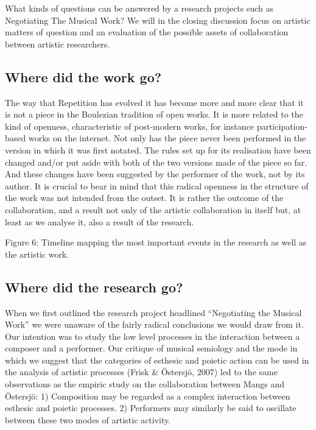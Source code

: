 What kinds of questions can be answered by a research projects such as
Negotiating The Musical Work? We will in the closing discussion focus
on artistic matters of question and an evaluation of the possible
assets of collaboration between artistic researchers.

\subsection{Where did the work go?}
\label{sec:where-did-work-1}

The way that Repetition has evolved it has become more and more clear
that it is not a piece in the Boulezian tradition of open works. It is
more related to the kind of openness, characteristic of post-modern
works, for instance participation-based works on the internet. Not
only has the piece never been performed in the version in which it was
first notated. The rules set up for its realisation have been changed
and/or put aside with both of the two versions made of the piece so
far. And these changes have been suggested by the performer of the
work, not by its author. It is crucial to bear in mind that this
radical openness in the structure of the work was not intended from
the outset. It is rather the outcome of the collaboration, and a
result not only of the artistic collaboration in itself but, at least
as we analyse it, also a result of the research.


Figure 6: Timeline mapping the most important events in the research as well as the artistic work.

\subsection{Where did the research go?}
\label{sec:where-did-research}

When we first outlined the research project headlined ``Negotiating
the Musical Work'' we were unaware of the fairly radical conclusions
we would draw from it. Our intention was to study the low level
processes in the interaction between a composer and a performer. Our
critique of musical semiology and the mode in which we suggest that
the categories of esthesic and poietic action can be used in the
analysis of artistic processes (Frisk \& \"{O}stersj\"{o}, 2007) led
to the same observations as the empiric study on the collaboration
between Mangs and \"{O}stersj\"{o}: 1) Composition may be regarded as
a complex interaction between esthesic and poietic processes. 2)
Performers may similarly be said to oscillate between these two modes
of artistic activity.


